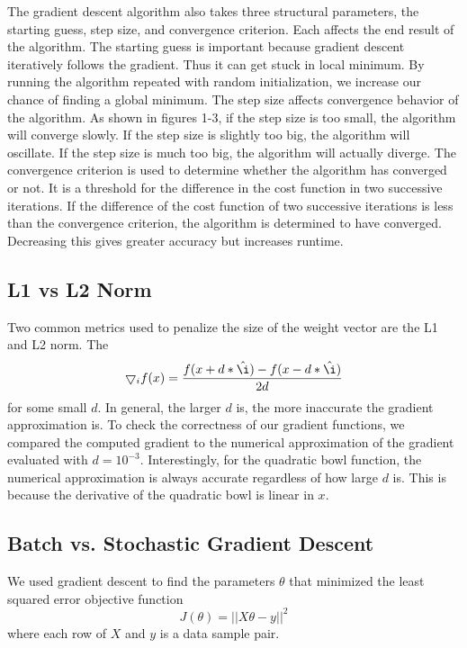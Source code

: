 \documentclass[a4paper,twoside]{article}
\begin{document}
The gradient descent algorithm also takes three structural parameters, the starting guess, step size, and convergence criterion. Each affects the end result of the algorithm. The starting guess is important because gradient descent iteratively follows the gradient. Thus it can get stuck in local minimum. By running the algorithm repeated with random initialization, we increase our chance of finding a global minimum. The step size affects convergence behavior of the algorithm. As shown in figures 1-3, if the step size is too small, the algorithm will converge slowly. If the step size is slightly too big, the algorithm will oscillate. If the step size is much too big, the algorithm will actually diverge. The convergence criterion is used to determine whether the algorithm has converged or not. It is a threshold for the difference in the cost function in two successive iterations. If the difference of the cost function of two successive iterations is less than the convergence criterion, the algorithm is determined to have converged. Decreasing this gives greater accuracy but increases runtime.

\subsection{L1 vs L2 Norm}

Two common metrics used to penalize the size of the weight vector are the L1 and L2 norm. The 
\begin{equation}
\bigtriangledown_i f(x) = \frac{f(x+d*\hat{\i}) - f(x-d*\hat{\i})}{2d}
\end{equation}
for some small $d$. In general, the larger $d$ is, the more inaccurate the gradient approximation is. To check the correctness of our gradient functions, we compared the computed gradient to the numerical approximation of the gradient evaluated with $d=10^{-3}$. Interestingly, for the quadratic bowl function, the numerical approximation is always accurate regardless of how large $d$ is. This is because the derivative of the quadratic bowl is linear in $x$.

\subsection{Batch vs. Stochastic Gradient Descent}
We used gradient descent to find the parameters $\theta$ that minimized the least squared error objective function
\begin{equation}
J(\theta) = ||X\theta - y||^2
\end{equation}
where each row of $X$ and $y$ is a data sample pair. 
\end{document}
